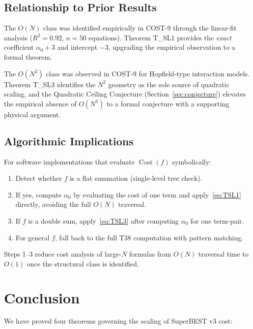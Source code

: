 \documentclass[12pt,a4paper]{article}
\theoremstyle{definition}
\newcommand{\Cost}{\operatorname{Cost}}
\begin{document}
\subsection{Relationship to Prior Results}

The $O(N)$ class was identified empirically in COST-9 through the linear-fit
analysis ($R^2 = 0.92$, $n = 50$ equations).  Theorem T\_SL1 provides the
\emph{exact} coefficient $\alpha_0 + 3$ and intercept $-3$, upgrading the
empirical observation to a formal theorem.

The $O(N^2)$ class was observed in COST-9 for Hopfield-type interaction models.
Theorem T\_SL3 identifies the $N^2$ geometry as the sole source of quadratic
scaling, and the Quadratic Ceiling Conjecture (Section~\ref{sec:conjecture})
elevates the empirical absence of $O(N^3)$ to a formal conjecture with a
supporting physical argument.

\subsection{Algorithmic Implications}

For software implementations that evaluate $\Cost(f)$ symbolically:
\begin{enumerate}
  \item Detect whether $f$ is a flat summation (single-level tree check).
  \item If yes, compute $\alpha_0$ by evaluating the cost of one term and
        apply~\eqref{eq:TSL1} directly, avoiding the full $O(N)$ traversal.
  \item If $f$ is a double sum, apply~\eqref{eq:TSL3} after computing $\alpha_0$
        for one term-pair.
  \item For general $f$, fall back to the full T38 computation with pattern
        matching.
\end{enumerate}
Steps 1--3 reduce cost analysis of large-$N$ formulas from $O(N)$ traversal
time to $O(1)$ once the structural class is identified.

\section*{Conclusion}

We have proved four theorems governing the scaling of SuperBEST v3 cost:
\end{document}
